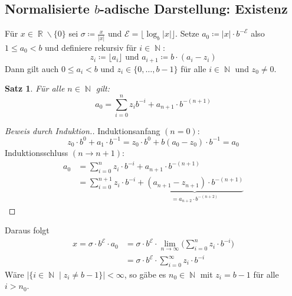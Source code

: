 \documentclass[a4paper,12pt]{article}
\DeclareMathOperator{\N}{\mathbb N}
\DeclareMathOperator{\R}{\mathbb R}
\newtheorem{satz}[axiom]{Satz}
\theoremstyle{definition}
\begin{document}
	\subsection{Normalisierte $b$-adische Darstellung: Existenz}
	Für $x \in \R \backslash\{0\}$ sei $\sigma \coloneq \frac{x}{\lvert x \rvert}$ und $\mathcal{E} = \lfloor \log_b \lvert x \rvert \rfloor$. Setze $a_0 \coloneq \lvert x\rvert \cdot b^{-\mathcal{E}}$ also $1 \leq a_0 < b$ und definiere rekursiv für $i \in \N$:
	\[
		z_i \coloneq \lfloor a_i \rfloor \text{ und } a_{i+1} \coloneq b \cdot (a_i - z_i)
	\]
	Dann gilt auch $0 \leq a_i < b$ und $z_i \in \{0,\ldots, b-1\}$ für alle $i \in \N$ und $z_0 \neq 0$.
	\begin{satz}
		Für alle $n \in \N$ gilt:
		\[
			a_0 = \sum_{i = 0}^{n} z_i b^{-i} + a_{n+1} \cdot b^{-(n+1)}
		\]
	\end{satz}
	\begin{proof}[Beweis durch Induktion.]
		Induktionsanfang $(n = 0)$:
		\[
			z_0 \cdot b^0 + a_1 \cdot b^{-1} = z_0 \cdot b^0 + b(a_0 - z_0) \cdot b^{-1} = a_0
		\]
		Induktionsschluss $(n \to n + 1)$:
		\begin{align*}
			a_0 &= \sum_{i = 0}^{n}z_i \cdot b^{-i} + a_{n+1} \cdot b^{-(n+1)}\\
			&= \sum_{i = 0}^{n+1}z_i \cdot b^{-i} + \underbrace{(a_{n+1} - z_{n+1}) \cdot b^{-(n+1)}}_{=a_{n+2} \cdot b^{-(n+2)}}
		\end{align*}
	\end{proof}
	Daraus folgt 
	\begin{align*}
		x = \sigma \cdot b^{\mathcal{E}} \cdot a_0 &= \sigma \cdot b^{\mathcal{E}} \cdot \lim_{n\to \infty}\Big(\sum_{i = 0}^{n}z_i \cdot b^{-i}\Big)\\
		&= \sigma \cdot b^{\mathcal{E}} \cdot \sum_{i = 0}^{\infty}z_i \cdot b^{-i}
	\end{align*}
	Wäre $\lvert \{i \in \N \mid z_i \neq b-1\}\rvert < \infty$, so gäbe es $n_0 \in \N$ mit $z_i = b-1$ für alle $i > n_0$.
\end{document}
